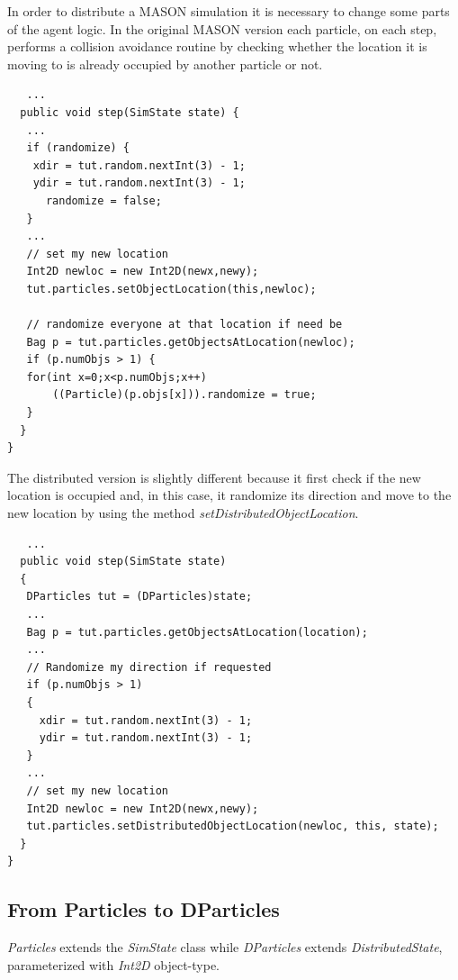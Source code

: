 \documentclass[12pt]{article}
\begin{document}
In order to distribute a MASON simulation it is necessary to change some parts of the agent logic. In the original MASON version each particle, on each step, performs a collision avoidance routine by checking whether the location it is moving to is already occupied by another particle or not. 

\begin{lstlisting}
   ...
  public void step(SimState state) {
   ...
   if (randomize) {
    xdir = tut.random.nextInt(3) - 1;
    ydir = tut.random.nextInt(3) - 1;
	  randomize = false;
   }
   ...
   // set my new location
   Int2D newloc = new Int2D(newx,newy);
   tut.particles.setObjectLocation(this,newloc);
   
   // randomize everyone at that location if need be
   Bag p = tut.particles.getObjectsAtLocation(newloc);
   if (p.numObjs > 1) {
   for(int x=0;x<p.numObjs;x++)
       ((Particle)(p.objs[x])).randomize = true;
   }
  }
}
\end{lstlisting}

The distributed version is slightly different because it first check if the new location is occupied and, in this case, it randomize its direction and move to the new location by using the method \textit{setDistributedObjectLocation}.


\begin{lstlisting}
   ...
  public void step(SimState state) 
  {
   DParticles tut = (DParticles)state;
   ...
   Bag p = tut.particles.getObjectsAtLocation(location);
   ...
   // Randomize my direction if requested
   if (p.numObjs > 1)
   {
     xdir = tut.random.nextInt(3) - 1;
     ydir = tut.random.nextInt(3) - 1;
   }
   ...
   // set my new location
   Int2D newloc = new Int2D(newx,newy);
   tut.particles.setDistributedObjectLocation(newloc, this, state);	
  }
}
\end{lstlisting}


\subsection{From Particles to DParticles}
\textit{Particles} extends the \textit{SimState} class  while \textit{DParticles} extends \textit{DistributedState}, parameterized with \textit{Int2D} object-type.
\end{document}

